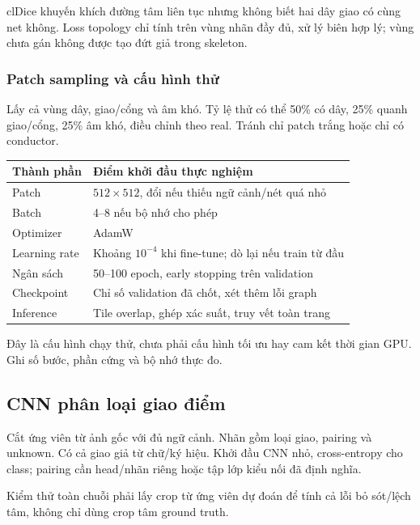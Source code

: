 \documentclass[11pt,a4paper]{article}
\begin{document}
clDice khuyến khích đường tâm liên tục nhưng không biết hai dây giao có cùng net không. Loss topology chỉ tính trên vùng nhãn đầy đủ, xử lý biên hợp lý; vùng chưa gán không được tạo đứt giả trong skeleton.

\subsubsection{Patch sampling và cấu hình thử}
Lấy cả vùng dây, giao/cổng và âm khó. Tỷ lệ thử có thể 50\% có dây, 25\% quanh giao/cổng, 25\% âm khó, điều chỉnh theo real. Tránh chỉ patch trắng hoặc chỉ có conductor.
\begin{center}
\small
\begin{tabularx}{\linewidth}{L{3.2cm}Y}
\toprule
Thành phần & Điểm khởi đầu thực nghiệm\\
\midrule
Patch & $512\times512$, đổi nếu thiếu ngữ cảnh/nét quá nhỏ\\
Batch & 4--8 nếu bộ nhớ cho phép\\
Optimizer & AdamW\\
Learning rate & Khoảng $10^{-4}$ khi fine-tune; dò lại nếu train từ đầu\\
Ngân sách & 50--100 epoch, early stopping trên validation\\
Checkpoint & Chỉ số validation đã chốt, xét thêm lỗi graph\\
Inference & Tile overlap, ghép xác suất, truy vết toàn trang\\
\bottomrule
\end{tabularx}
\end{center}
Đây là cấu hình chạy thử, chưa phải cấu hình tối ưu hay cam kết thời gian GPU. Ghi số bước, phần cứng và bộ nhớ thực đo.

\subsection{CNN phân loại giao điểm}
Cắt ứng viên từ ảnh gốc với đủ ngữ cảnh. Nhãn gồm loại giao, pairing và unknown. Có cả giao giả từ chữ/ký hiệu. Khởi đầu CNN nhỏ, cross-entropy cho class; pairing cần head/nhãn riêng hoặc tập lớp kiểu nối đã định nghĩa.

Kiểm thử toàn chuỗi phải lấy crop từ ứng viên dự đoán để tính cả lỗi bỏ sót/lệch tâm, không chỉ dùng crop tâm ground truth.
\end{document}
